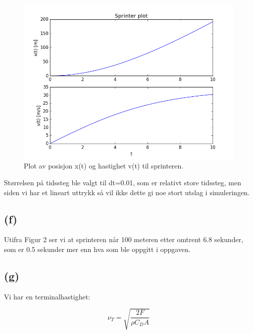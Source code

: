 \documentclass[a4paper,norsk,12pt]{article}
\begin{document}
\begin{figure}[H]

  \includegraphics[width=\linewidth]{sprinter01.png}

  \caption{Plot av posisjon x(t) og hastighet v(t) til sprinteren.}

  \label{fig:plot3}

\end{figure}

\noindent
Størrelsen på tidssteg ble valgt til dt=0.01, som er relativt store tidssteg, men siden vi har et lineart uttrykk så vil ikke dette gi noe stort utslag i simuleringen.\\

\noindent
\subsection*{(f)}

\noindent
Utifra Figur 2 ser vi at sprinteren når 100 meteren etter omtrent 6.8 sekunder, som er 0.5 sekunder mer enn hva som ble oppgitt i oppgaven. \\

\noindent
\subsection*{(g)}

\noindent
Vi har en terminalhastighet:

\begin{equation}
	\nu_T = \sqrt{\dfrac{2F}{\rho C_D A}}
\end{equation}
\end{document}
